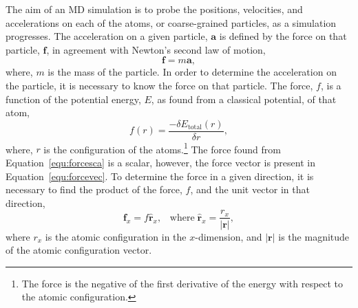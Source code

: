 The aim of an MD simulation is to probe the positions, velocities, and accelerations on each of the atoms, or coarse-grained particles, as a simulation progresses.
The acceleration on a given particle, $\mathbf{a}$ is defined by the force on that particle, $\mathbf{f}$, in agreement with Newton's second law of motion,
%
\begin{equation}
\mathbf{f} = m\mathbf{a},
\label{equ:forcevec}
\end{equation}
%
where, $m$ is the mass of the particle.
In order to determine the acceleration on the particle, it is necessary to know the force on that particle.
The force, $f$, is a function of the potential energy, $E$, as found from a classical potential, of that atom,
%
\begin{equation}
f(r) = \frac{-\delta E_{\text{total}}(r)}{\delta r},
\label{equ:forcesca}
\end{equation}
%
where, $r$ is the configuration of the atoms.\footnote{The force is the negative of the first derivative of the energy with respect to the atomic configuration.}
The force found from Equation~\ref{equ:forcesca} is a scalar, however, the force vector is present in Equation~\ref{equ:forcevec}.
To determine the force in a given direction, it is necessary to find the product of the force, $f$, and the unit vector in that direction,
%
\begin{equation}
\mathbf{f}_x = f\hat{\mathbf{r}}_x, \;\;\;\text{where}\;\hat{\mathbf{r}}_x = \frac{r_x}{|\mathbf{r}|},
\end{equation}
%
where $r_x$ is the atomic configuration in the $x$-dimension, and $|\mathbf{r}|$ is the magnitude of the atomic configuration vector.

